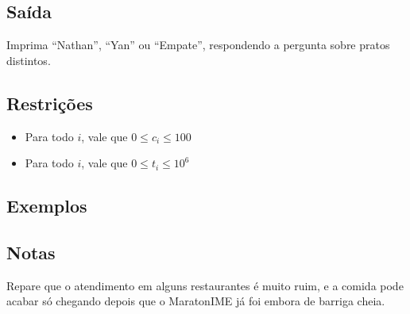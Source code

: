 \subsection*{Saída}

Imprima ``Nathan'', ``Yan'' ou ``Empate'', respondendo a pergunta sobre
pratos distintos.


\subsection*{Restrições}
\begin{itemize}
    \item Para todo $i$, vale que $0 \leq c_i \leq 100$
    \item Para todo $i$, vale que $0 \leq t_i \leq 10^6$
\end{itemize}

\subsection*{Exemplos}

\subsection*{Notas}
Repare que o atendimento em alguns restaurantes é muito ruim, e a comida
pode acabar só chegando depois que o MaratonIME já foi embora de barriga
cheia.
